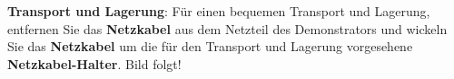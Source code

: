\begin{itemize}
\textbf{Transport und Lagerung}: Für einen bequemen Transport und Lagerung, entfernen Sie das \textbf{Netzkabel} aus dem Netzteil des Demonstrators und wickeln Sie das \textbf{Netzkabel} um die für den Transport und Lagerung vorgesehene \textbf{Netzkabel-Halter}. Bild folgt!
\end{itemize}

